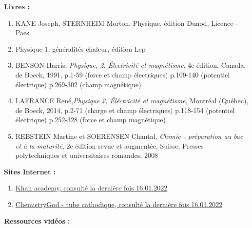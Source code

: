 \documentclass[../main.tex]{subfiles}
\begin{document}
\textbf{Livres :}\\
\begin{enumerate}
    \item KANE Joseph, STERNHEIM Morton, Physique, édition Dunod, Licence - Paes
    \item Physique 1, généralités chaleur, édition Lep
    \item BENSON Harris, \textit{Physique, 2. Électricité et magnétisme}, 4e édition, Canada, de Boeck, 1991, p.1-59 (force et champ électriques) p.109-140 (potentiel électrique) p.269-302 (champ magnétique)
    \item LAFRANCE René,\textit{Physique 2, Éléctricité et magnétisme}, Montréal (Québec), de Boeck, 2014, p.2-71 (charge et champ électriques) p.118-154 (potentiel électrique) p.252-328 (force et champ magnétique)
    \item REBSTEIN Martine et SOERENSEN Chantal, \textit{Chimie - préparation au bac et à la maturité}, 2e édition revue et augmentée, Suisse, Presses polytechniques et universitaires romandes, 2008
\end{enumerate}
\textbf{Sites Internet :}\\
\begin{enumerate}
    \item \href{https://fr.khanacademy.org/science/chemistry/electronic-structure-of-atoms/history-of-atomic-structure/a/discovery-of-the-electron-and-nucleus}{Khan academy, consulté la dernière fois 16.01.2022}
    \item \href{https://chemistrygod.com/cathode-ray-tube-experiments}{ChemistryGod - tube cathodique, consulté la dernière fois 16.01.2022}\\
\end{enumerate}
\textbf{Ressources vidéos :}\\
\end{document}
